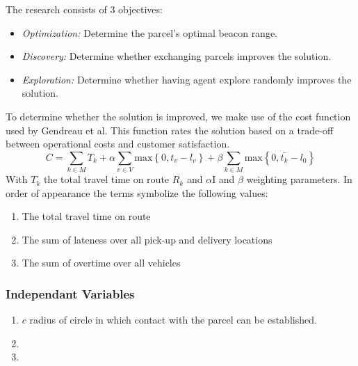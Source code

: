 \documentclass[../main.tex]{subfiles}
\begin{document}
The research consists of 3 objectives:
\begin{itemize}
	\item \textit{Optimization:} Determine the parcel's optimal beacon range.
	\item \textit{Discovery:} Determine whether exchanging parcels improves the solution.
	\item \textit{Exploration:} Determine whether having agent explore randomly improves the solution.
\end{itemize}
To determine whether the solution is improved, we make use of the cost function used by Gendreau et al. This function rates the solution based on a trade-off between operational costs and customer satisfaction. \cite{gendreau2006neighborhood}
$$
C = \sum_{k \in M}{T_k} + \alpha \sum_{v \in V} \text{max} \left\{ 0, t_v - l_v \right\} + \beta \sum_{k \in M} \text{max} \left\{0, \bar{t_k} - l_0 \right\}
$$
With $T_k$ the total travel time on route $R_k$ and $\alpha$I and $\beta$ weighting parameters. In order of appearance the terms symbolize the following values:
\begin{enumerate}
	\item The total travel time on route
	\item The sum of lateness over all pick-up and delivery locations
	\item The sum of overtime over all vehicles
\end{enumerate}

\subsubsection{Independant Variables}
\begin{enumerate}
	\item $c$ radius of circle in which contact with the parcel can be established.
	\item
	\item
\end{enumerate}
\end{document}
